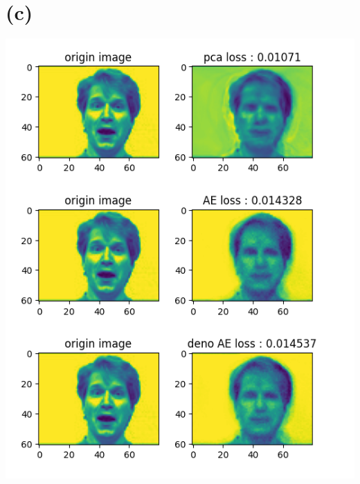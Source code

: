 \documentclass[12pt,a4paper]{article}
\begin{document}
\section*{(c)}
\includegraphics{Figure3.png}
\newpage
\end{document}
